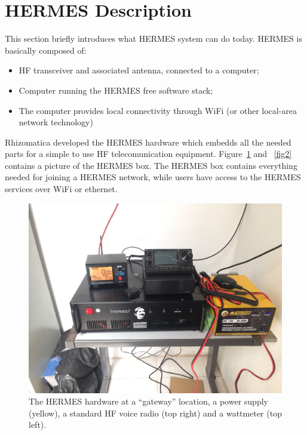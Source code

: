 \documentclass[11pt,a4paper]{article}
\begin{document}

\section{HERMES Description}

This section briefly introduces what HERMES system can do today. HERMES is basically composed of:

\begin{itemize}
\item HF transceiver and associated antenna, connected to a computer;
\item Computer running the HERMES free software stack;
\item The computer provides local connectivity through WiFi (or other local-area network
  technology)
\end{itemize}

Rhizomatica developed the HERMES hardware which embedds all the needed parts for a simple to use
HF telecomunication equipment. Figure~\ref{fig1} and ~\ref{fig2} contains a picture of the HERMES box. The HERMES box contains
everything needed for joining a HERMES network, while users have access to the HERMES services over WiFi or ethernet.


\begin{figure}[h!]
  \centering
  \includegraphics[scale=0.15]{hermes-pic1.jpeg}
  \caption{The HERMES hardware at a ``gateway'' location, a power supply (yellow), a standard HF voice radio (top right) and a wattmeter (top left).}
  \label{fig1}
\end{figure}
\end{document}
